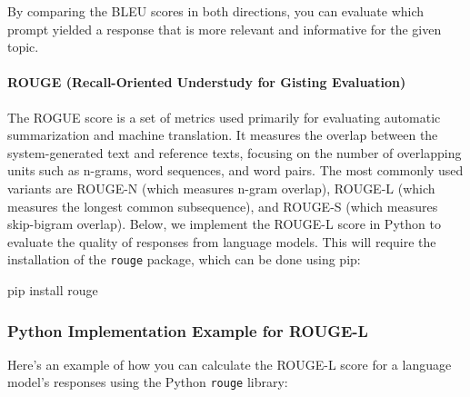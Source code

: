 \documentclass[
]{agujournal2019}
\let\oldparagraph\paragraph
\renewcommand{\paragraph}[1]{\oldparagraph{#1}\mbox{}}
\newenvironment{Shaded}{\begin{snugshade}}{\end{snugshade}}
\newcommand{\ExtensionTok}[1]{\textcolor[rgb]{0.00,0.23,0.31}{#1}}
\newcommand{\NormalTok}[1]{\textcolor[rgb]{0.00,0.23,0.31}{#1}}
\begin{document}
By comparing the BLEU scores in both directions, you can evaluate which
prompt yielded a response that is more relevant and informative for the
given topic.

\paragraph{ROUGE (Recall-Oriented Understudy for Gisting
Evaluation)}\label{rouge-recall-oriented-understudy-for-gisting-evaluation}

The ROGUE score is a set of metrics used primarily for evaluating
automatic summarization and machine translation. It measures the overlap
between the system-generated text and reference texts, focusing on the
number of overlapping units such as n-grams, word sequences, and word
pairs. The most commonly used variants are ROUGE-N (which measures
n-gram overlap), ROUGE-L (which measures the longest common
subsequence), and ROUGE-S (which measures skip-bigram overlap). Below,
we implement the ROUGE-L score in Python to evaluate the quality of
responses from language models. This will require the installation of
the \texttt{rouge} package, which can be done using pip:

\begin{Shaded}
\begin{Highlighting}[]
\ExtensionTok{pip}\NormalTok{ install rouge}
\end{Highlighting}
\end{Shaded}

\subsubsection{Python Implementation Example for
ROUGE-L}\label{python-implementation-example-for-rouge-l}

Here's an example of how you can calculate the ROUGE-L score for a
language model's responses using the Python \texttt{rouge} library:
\end{document}
